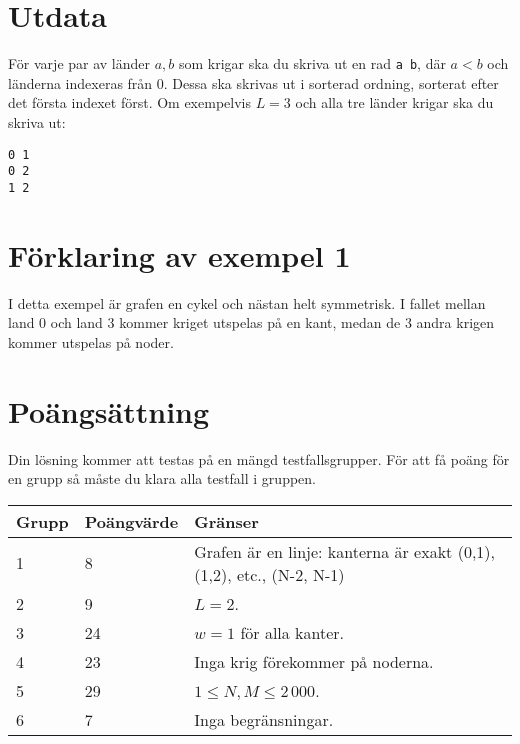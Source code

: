 \section*{Utdata}

För varje par av länder $a, b$ som krigar ska du skriva ut en rad \texttt{a b}, där $a < b$ och länderna indexeras från 0.
Dessa ska skrivas ut i sorterad ordning, sorterat efter det första indexet först.
Om exempelvis $L = 3$ och alla tre länder krigar ska du skriva ut:
\begin{lstlisting}
0 1
0 2
1 2
\end{lstlisting}

\section*{Förklaring av exempel 1}

I detta exempel är grafen en cykel och nästan helt symmetrisk. I fallet mellan
land 0 och land 3 kommer kriget utspelas på en kant, medan de 3 andra krigen
kommer utspelas på noder.

\section*{Poängsättning}
Din lösning kommer att testas på en mängd testfallsgrupper. För att få poäng för en grupp
så måste du klara alla testfall i gruppen.

\noindent
\begin{tabular}{| l | l | l |}
\hline
Grupp & Poängvärde & Gränser \\ \hline
1     & 8          & Grafen är en linje: kanterna är exakt (0,1), (1,2), etc., (N-2, N-1) \\ \hline
2     & 9          & $L = 2$. \\ \hline
3     & 24         & $w = 1$ för alla kanter. \\ \hline
4     & 23         & Inga krig förekommer på noderna. \\ \hline
5     & 29         & $1 \le N, M \le 2\,000$. \\ \hline
6     & 7          & Inga begränsningar. \\ \hline
\end{tabular}
